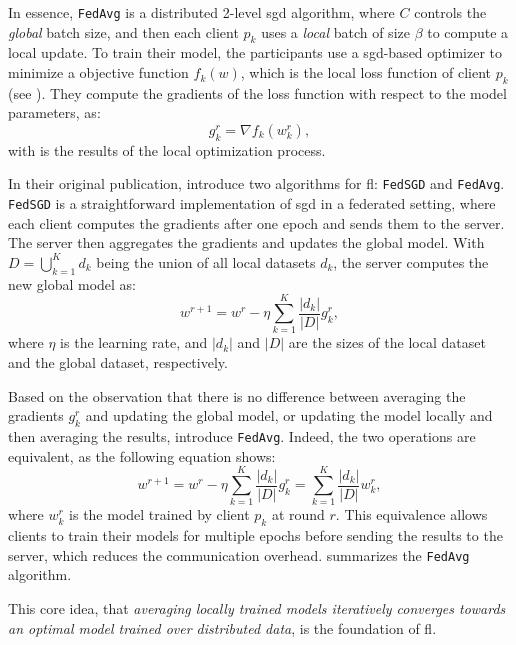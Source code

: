 In essence, \texttt{FedAvg} is a distributed 2-level \gls{sgd} algorithm, where $C$ controls the \emph{global} batch size, and then each client $p_k$ uses a \emph{local} batch of size $\beta$ to compute a local update.
To train their model, the participants use a \gls{sgd}-based optimizer to minimize a objective function $f_k(w)$, which is the local loss function of client $p_k$ (see ).
They compute the gradients of the loss function with respect to the model parameters, as:
\begin{equation}
  g_k^r = \nabla f_k(w_k^r),
\end{equation}
with is the results of the local optimization process.

In their original publication, \textcite{mcmahan_Communicationefficientlearningdeep_2017} introduce two algorithms for \gls{fl}: \texttt{FedSGD} and \texttt{FedAvg}.
\texttt{FedSGD} is a straightforward implementation of \gls{sgd} in a federated setting, where each client computes the gradients after one epoch and sends them to the server.
The server then aggregates the gradients and updates the global model.
With $D=\bigcup_{k=1}^K d_k$ being the union of all local datasets $d_k$, the server computes the new global model as:
\begin{equation}
  w^{r+1} = w^r - \eta \sum_{k=1}^{K} \frac{|d_k|}{|D|} g_k^r,
\end{equation}
where $\eta$ is the learning rate, and $|d_k|$ and $|D|$ are the sizes of the local dataset and the global dataset, respectively.

Based on the observation that there is no difference between averaging the gradients $g_k^r$ and updating the global model, or updating the model locally and then averaging the results, \textcite{mcmahan_Communicationefficientlearningdeep_2017} introduce \texttt{FedAvg}.
Indeed, the two operations are equivalent, as the following equation shows:
\begin{equation}
  w^{r+1} = w^r - \eta \sum_{k=1}^{K} \frac{|d_k|}{|D|} g_k^r = \sum_{k=1}^{K} \frac{|d_k|}{|D|} w_k^r,
\end{equation}
where $w_k^r$ is the model trained by client $p_k$ at round $r$.
This equivalence allows clients to train their models for multiple epochs before sending the results to the server, which reduces the communication overhead.
 summarizes the \texttt{FedAvg} algorithm.

This core idea, that \emph{averaging locally trained models iteratively converges towards an optimal model trained over distributed data}, is the foundation of \gls{fl}.

